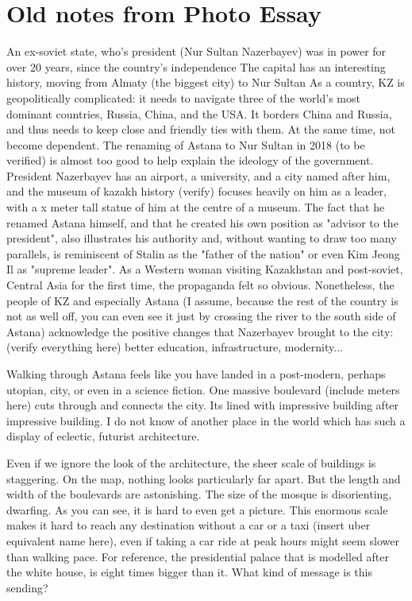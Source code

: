 \documentclass[11pt]{article}
\begin{document}
\section{Old notes from Photo Essay}


An ex-soviet state, who's president (Nur Sultan Nazerbayev) was in power for over 20 years, since the country's independence
The capital has an interesting history, moving from Almaty (the biggest city) to Nur Sultan
As a country, KZ is geopolitically complicated: it needs to navigate three of the world's most dominant countries, Russia, China, and the USA. It borders China and Russia, and thus needs to keep close and friendly ties with them. At the same time, not become dependent.
The renaming of Astana to Nur Sultan in 2018 (to be verified) is almost too good to help explain the ideology of the government. President Nazerbayev has an airport, a university, and a city named after him, and the museum of kazakh history (verify) focuses heavily on him as a leader, with a x meter tall statue of him at the centre of a museum.
 The fact that he renamed Astana himself, and that he created his own position as "advisor to the president", also illustrates his authority and, without wanting to draw too many parallels, is reminiscent of Stalin as the "father of the nation" or even Kim Jeong Il as "supreme leader". 
 As a Western woman visiting Kazakhstan and post-soviet, Central Asia for the first time, the propaganda felt so obvious.
 Nonetheless, the people of KZ and especially Astana (I assume, because the rest of the country is not as well off, you can even see it just by crossing the river to the south side of Astana) acknowledge the positive changes that Nazerbayev brought to the city: (verify everything here) better education, infrastructure, modernity...
 
Walking through Astana feels like you have landed in a post-modern, perhaps utopian, city, or even in a science fiction. One massive boulevard (include meters here) cuts through and connects the city. Its lined with impressive building after impressive building. I do not know of another place in the world which has such a display of eclectic, futurist architecture.

Even if we ignore the look of the architecture, the sheer scale of buildings is staggering. On the map, nothing looks particularly far apart. But the length and width of the boulevards are astonishing. The size of the mosque is disorienting, dwarfing. As you can see, it is hard to even get a picture. 
This enormous scale makes it hard to reach any destination without a car or a taxi (insert uber equivalent name here), even if taking a car ride at peak hours might seem slower than walking pace. 
For reference, the presidential palace that is modelled after the white house, is eight times bigger than it. What kind of message is this sending? 
\end{document}
